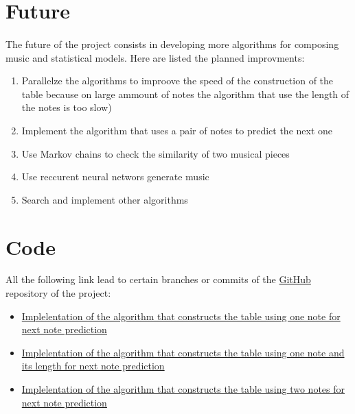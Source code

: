 \documentclass[]{article}
\begin{document}
        \newpage
    \section{Future}
        \paragraph{}The future of the project consists in developing more algorithms for composing music and statistical models. Here are listed the planned improvments:
        \begin{enumerate}
            \item Parallelze the algorithms to improove the speed of the construction of the table because on large ammount of notes the algorithm that use the length of the notes is too slow)
            \item Implement the algorithm that uses a pair of notes to predict the next one
            \item Use Markov chains to check the similarity of two musical pieces
            \item Use reccurent neural networs generate music
            \item Search and implement other algorithms
        \end{enumerate}
    \section{Code}
        All the following link lead to certain branches or commits of the \href{https://github.com}{GitHub} repository of the project:
        \begin{itemize}
            \item \href{https://github.com/Ro6afF/compmus/tree/0cf9173a547a9effdc720dc6f6ac8ad551cd2fa4}{Implelentation of the algorithm that constructs the table using one note for next note prediction}
            \item \href{https://github.com/Ro6afF/compmus/tree/One_note_with_time}{Implelentation of the algorithm that constructs the table using one note and its length for next note prediction}
            \item \href{https://github.com/Ro6afF/compmus/tree/72fbc777ef7371ac7810d87d306ba3a2e8267121}{Implelentation of the algorithm that constructs the table using two notes for next note prediction}
        \end{itemize}
\end{document}
